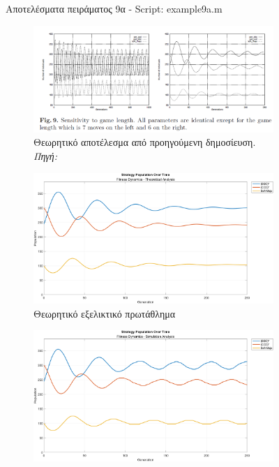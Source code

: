 \documentclass[12pt]{report}
\begin{document}
\begin{figure}[htbp]
\begin{subfigure}[b]{0.5\linewidth}
    \end{subfigure}

    \caption{Αποτελέσματα πειράματος 9α - \foreignlanguage{english}{Script: example9a.m}}
    \label{fig:fig_fit_9a}
\end{figure}

\begin{figure}[htbp]
    \centering

    \begin{subfigure}[b]{0.5\linewidth}
        \centering
        \includegraphics[width=\linewidth]{Figures Fitness Dynamics/9.png}
        \caption{Θεωρητικό αποτέλεσμα από προηγούμενη δημοσίευση. \textit{Πηγή:} \protect\cite{mathieu1999}}
    \end{subfigure}
    \hfill
    \begin{subfigure}[b]{0.5\linewidth}
        \centering
        \includegraphics[width=\linewidth]{Figures Fitness Dynamics/example9b.png}
        \caption{Θεωρητικό εξελικτικό πρωτάθλημα}
        \label{fig:fig_fit_9b_b}
    \end{subfigure}
    \hfill
    \begin{subfigure}[b]{0.5\linewidth}
        \centering
        \includegraphics[width=\linewidth]{Figures Fitness Dynamics/example9b-sim.png}

\end{subfigure}
\end{figure}
\end{document}
